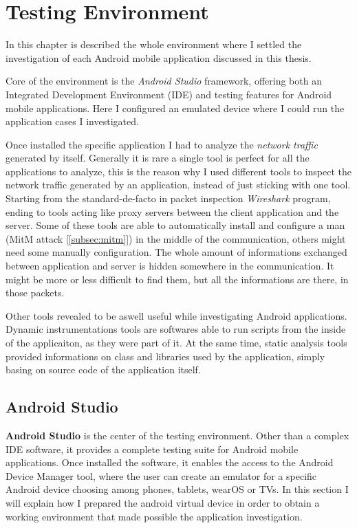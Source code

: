 \chapter{Testing Environment}
\label{chap:testing_environment}
	
	\par In this chapter is described the whole environment where I settled the investigation of each Android mobile application discussed in this thesis.
	\par Core of the environment is the \textit{Android Studio} framework, offering both an Integrated Development Environment (IDE) and testing features for Android mobile applications. Here I configured an emulated device where I could run the application cases I investigated.
	\par Once installed the specific application I had to analyze the \textit{network traffic} generated by itself. Generally it is rare a single tool is perfect for all the applications to analyze, this is the reason why I used different tools to inspect the network traffic generated by an application, instead of just sticking with one tool. Starting from the standard-de-facto in packet inspection \textit{Wireshark} program, ending to tools acting like proxy servers between the client application and the server. Some of these tools are able to automatically install and configure a man (MitM attack [\ref{subsec:mitm}]) in the middle of the communication, others might need some manually configuration. \newline
	The whole amount of informations exchanged between application and server is hidden somewhere in the communication. It might be more or less difficult to find them, but all the informations are there, in those packets.
	\par Other tools revealed to be aswell useful while investigating Android applications. Dynamic instrumentations tools are softwares able to run scripts from the inside of the applicaiton, as they were part of it. At the same time, static analysis tools provided informations on class and libraries used by the application, simply basing on source code of the application itself.
	
	\section{Android Studio}
		\par \textbf{Android Studio} is the center of the testing environment. Other than a complex IDE software, it provides a complete testing suite for Android mobile applications. Once installed the software, it enables the access to the Android Device Manager tool, where the user can create an emulator for a specific Android device choosing among phones, tablets, wearOS or TVs. 
		In this section I will explain how I prepared the android virtual device in order to obtain a working environment that made possible the application investigation.
		

